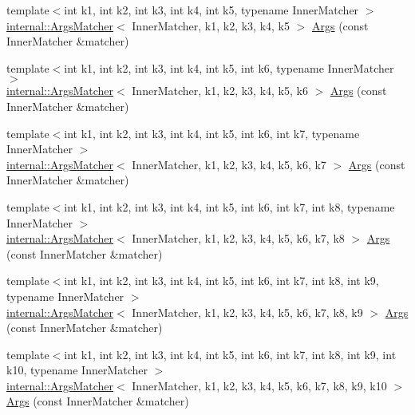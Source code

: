 \begin{DoxyCompactItemize}
\item 
{\footnotesize template$<$int k1, int k2, int k3, int k4, int k5, typename Inner\+Matcher $>$ }\\\mbox{\hyperlink{classtesting_1_1internal_1_1ArgsMatcher}{internal\+::\+Args\+Matcher}}$<$ Inner\+Matcher, k1, k2, k3, k4, k5 $>$ \mbox{\hyperlink{namespacetesting_aede9fd33cce0d21f5e31ba10a0706827}{Args}} (const Inner\+Matcher \&matcher)
\item 
{\footnotesize template$<$int k1, int k2, int k3, int k4, int k5, int k6, typename Inner\+Matcher $>$ }\\\mbox{\hyperlink{classtesting_1_1internal_1_1ArgsMatcher}{internal\+::\+Args\+Matcher}}$<$ Inner\+Matcher, k1, k2, k3, k4, k5, k6 $>$ \mbox{\hyperlink{namespacetesting_abc92e87b4a9cad372b082d81479f3d48}{Args}} (const Inner\+Matcher \&matcher)
\item 
{\footnotesize template$<$int k1, int k2, int k3, int k4, int k5, int k6, int k7, typename Inner\+Matcher $>$ }\\\mbox{\hyperlink{classtesting_1_1internal_1_1ArgsMatcher}{internal\+::\+Args\+Matcher}}$<$ Inner\+Matcher, k1, k2, k3, k4, k5, k6, k7 $>$ \mbox{\hyperlink{namespacetesting_a9a9ef7a866b397430527076e342817f9}{Args}} (const Inner\+Matcher \&matcher)
\item 
{\footnotesize template$<$int k1, int k2, int k3, int k4, int k5, int k6, int k7, int k8, typename Inner\+Matcher $>$ }\\\mbox{\hyperlink{classtesting_1_1internal_1_1ArgsMatcher}{internal\+::\+Args\+Matcher}}$<$ Inner\+Matcher, k1, k2, k3, k4, k5, k6, k7, k8 $>$ \mbox{\hyperlink{namespacetesting_ae8a4e8e1b8eb87c9f1e5f02519da7fce}{Args}} (const Inner\+Matcher \&matcher)
\item 
{\footnotesize template$<$int k1, int k2, int k3, int k4, int k5, int k6, int k7, int k8, int k9, typename Inner\+Matcher $>$ }\\\mbox{\hyperlink{classtesting_1_1internal_1_1ArgsMatcher}{internal\+::\+Args\+Matcher}}$<$ Inner\+Matcher, k1, k2, k3, k4, k5, k6, k7, k8, k9 $>$ \mbox{\hyperlink{namespacetesting_a62c877e01fb9098cd3c399f921bf4e3e}{Args}} (const Inner\+Matcher \&matcher)
\item 
{\footnotesize template$<$int k1, int k2, int k3, int k4, int k5, int k6, int k7, int k8, int k9, int k10, typename Inner\+Matcher $>$ }\\\mbox{\hyperlink{classtesting_1_1internal_1_1ArgsMatcher}{internal\+::\+Args\+Matcher}}$<$ Inner\+Matcher, k1, k2, k3, k4, k5, k6, k7, k8, k9, k10 $>$ \mbox{\hyperlink{namespacetesting_a09ac462e8d6ed468cbfaa9c767aee0aa}{Args}} (const Inner\+Matcher \&matcher)

\end{DoxyCompactItemize}
